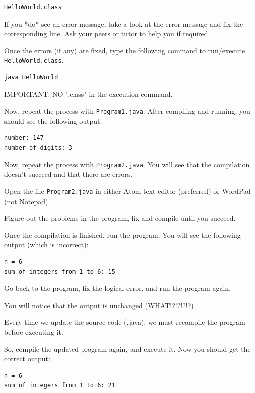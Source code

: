 \begin{questions}
\begin{lstlisting}[numbers=none]
HelloWorld.class
\end{lstlisting}

If you *do* see an error message, take a look at the error message and fix the corresponding line. Ask your peers or tutor to help you if required.

Once the errors (if any) are fixed, type the following command to run/execute \texttt{HelloWorld.class}. 

\begin{lstlisting}[numbers=none]
java HelloWorld
\end{lstlisting}

IMPORTANT: NO ".class" in the execution command.

Now, repeat the process with \texttt{Program1.java}. After compiling and running, you should see the following output:

\begin{lstlisting}[numbers=none]
number: 147
number of digits: 3
\end{lstlisting}

Now, repeat the process with \texttt{Program2.java}. You will see that the compilation doesn't succeed and that there are errors.

Open the file \texttt{Program2.java} in either Atom text editor (preferred) or WordPad (not Notepad).

Figure out the problems in the program, fix and compile until you succeed.

Once the compilation is finished, run the program. You will see the following output (which is incorrect):

\begin{lstlisting}[numbers=none]
n = 6
sum of integers from 1 to 6: 15	
\end{lstlisting}

Go back to the program, fix the logical error, and run the program again.

You will notice that the output is unchanged (WHAT!?!?!?!?)

Every time we update the source code (.java), we must recompile the program before executing it.

So, compile the updated program again, and execute it. Now you should get the correct output:

\begin{lstlisting}[numbers=none]
n = 6
sum of integers from 1 to 6: 21
\end{lstlisting}


\end{questions}

